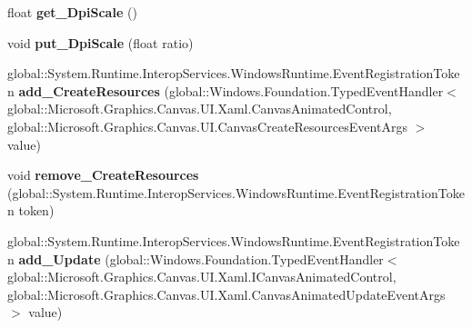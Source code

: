 \begin{DoxyCompactItemize}
float {\bfseries get\+\_\+\+Dpi\+Scale} ()
\item 
\mbox{\label{interface_microsoft_1_1_graphics_1_1_canvas_1_1_u_i_1_1_xaml_1_1_i_canvas_animated_control_a3434abed58869d5f025b85596f8a92a0}} 
void {\bfseries put\+\_\+\+Dpi\+Scale} (float ratio)
\item 
\mbox{\label{interface_microsoft_1_1_graphics_1_1_canvas_1_1_u_i_1_1_xaml_1_1_i_canvas_animated_control_af05296a1a18229faaeee054fa63665aa}} 
global\+::\+System.\+Runtime.\+Interop\+Services.\+Windows\+Runtime.\+Event\+Registration\+Token {\bfseries add\+\_\+\+Create\+Resources} (global\+::\+Windows.\+Foundation.\+Typed\+Event\+Handler$<$ global\+::\+Microsoft.\+Graphics.\+Canvas.\+U\+I.\+Xaml.\+Canvas\+Animated\+Control, global\+::\+Microsoft.\+Graphics.\+Canvas.\+U\+I.\+Canvas\+Create\+Resources\+Event\+Args $>$ value)
\item 
\mbox{\label{interface_microsoft_1_1_graphics_1_1_canvas_1_1_u_i_1_1_xaml_1_1_i_canvas_animated_control_a4911c1a0849c77431433f7738b46dda9}} 
void {\bfseries remove\+\_\+\+Create\+Resources} (global\+::\+System.\+Runtime.\+Interop\+Services.\+Windows\+Runtime.\+Event\+Registration\+Token token)
\item 
\mbox{\label{interface_microsoft_1_1_graphics_1_1_canvas_1_1_u_i_1_1_xaml_1_1_i_canvas_animated_control_aee65ebdd3be32b82bf4a1554f8c2b8c6}} 
global\+::\+System.\+Runtime.\+Interop\+Services.\+Windows\+Runtime.\+Event\+Registration\+Token {\bfseries add\+\_\+\+Update} (global\+::\+Windows.\+Foundation.\+Typed\+Event\+Handler$<$ global\+::\+Microsoft.\+Graphics.\+Canvas.\+U\+I.\+Xaml.\+I\+Canvas\+Animated\+Control, global\+::\+Microsoft.\+Graphics.\+Canvas.\+U\+I.\+Xaml.\+Canvas\+Animated\+Update\+Event\+Args $>$ value)
\item 
\mbox{\label{interface_microsoft_1_1_graphics_1_1_canvas_1_1_u_i_1_1_xaml_1_1_i_canvas_animated_control_aab80ec4a2429b892a73b2956101de68e}} 

\end{DoxyCompactItemize}
